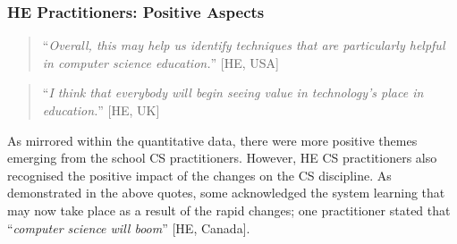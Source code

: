 \documentclass[conference]{IEEEtran}
\begin{document}

\subsubsection{HE Practitioners: Positive Aspects}

\begin{quotation}
``{\emph{Overall, this may help us identify techniques that are
particularly helpful in computer science education.}}'' [HE, USA]
\end{quotation}

\begin{quotation}
``{\emph{I think that everybody will begin seeing value in
    technology’s place in education.}}'' [HE, UK]
\end{quotation}


As mirrored within the quantitative data, there were more positive
themes emerging from the school CS practitioners. However, HE CS
practitioners also recognised the positive impact of the changes on
the CS discipline. As demonstrated in the above quotes,
some acknowledged the system learning that may now take place as a
result of the rapid changes; one practitioner stated that
``{\emph{computer science will boom}}'' [HE, Canada].
\end{document}
